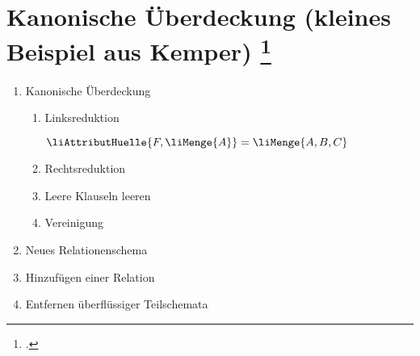 \documentclass{lehramt-informatik-aufgabe}
\begin{document}
\let\FA=\liFunktionaleAbhaengigkeiten
\let\fa=\liFunktionaleAbhaengigkeit
\let\m=\liMenge


\section{Kanonische Überdeckung (kleines Beispiel aus Kemper)
\footcite[Seite 186]{kemper}
}

\FA{A -> B; B -> C; A, B -> C}

\begin{enumerate}
\item Kanonische Überdeckung

\begin{enumerate}
\item Linksreduktion

$\liAttributHuelle{F, \m{A}} = \m{A, B, C}$


\item Rechtsreduktion


\item Leere Klauseln leeren


\item Vereinigung
\end{enumerate}
\item Neues Relationenschema


\item Hinzufügen einer Relation
\item Entfernen überflüssiger Teilschemata

\end{enumerate}
\end{document}

